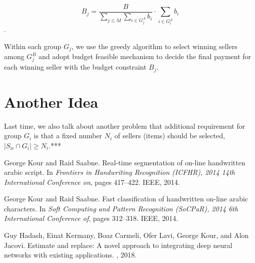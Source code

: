 \documentclass{article}
\begin{document}
\begin{equation}
    B_j=\frac{B}{\sum_{j\le M}\sum_{i\in G_j^A}b_i}\cdot \sum_{i\in G_i^A}b_i
\end{equation}.


Within each group $G_j$, we use the greedy algorithm to select winning sellers among $G_j^B$ and adopt budget feasible mechanism to decide the final payment for each winning seller with the budget constraint $B_j$.
 
\section{Another Idea}
Last time, we also talk about another  problem that additional requirement for  group $G_i$ is that a fixed number $N_i$ of sellers (items) should be selected, $|S_w\cap G_i|\ge N_i$.***


  


\begin{thebibliography}{1}

George Kour and Raid Saabne.
\newblock Real-time segmentation of on-line handwritten arabic script.
\newblock In {\em Frontiers in Handwriting Recognition (ICFHR), 2014 14th
  International Conference on}, pages 417--422. IEEE, 2014.

George Kour and Raid Saabne.
\newblock Fast classification of handwritten on-line arabic characters.
\newblock In {\em Soft Computing and Pattern Recognition (SoCPaR), 2014 6th
  International Conference of}, pages 312--318. IEEE, 2014.

Guy Hadash, Einat Kermany, Boaz Carmeli, Ofer Lavi, George Kour, and Alon
  Jacovi.
\newblock Estimate and replace: A novel approach to integrating deep neural
  networks with existing applications.
, 2018.

\end{thebibliography}
\end{document}
